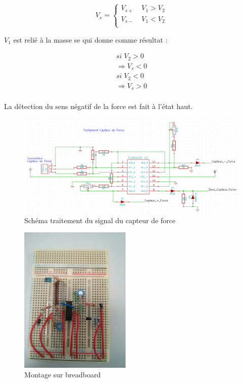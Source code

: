 \documentclass[11pt]{article}
\begin{document}
\begin{equation}
	V_{s} = 
	\left\{
	  \begin{array}{rcr}
	    V_{s+}& \; V_{1}>V_{2} \\
	    V_{s-}& \; V_{1}<V_{2} \\
	  \end{array}
	\right.
\end{equation}

$V_{1}$ est relié à la masse se qui donne comme résultat :

\begin{equation}
 	\begin{split}
		si \; V_{2} > 0 \\
		\Rightarrow V_{s} < 0 \\			
		si \; V_{2} < 0 \\
		\Rightarrow V_{s} > 0 \\			
	\end{split}
\end{equation}

La détection du sens négatif de la force est fait à l'état haut.

\begin{figure}[!h]
    \centering
    \includegraphics[width=500px]{schema_force.png}
    \caption{Schéma traitement du signal du capteur de force}
\end{figure}

\begin{figure}[!h]
    \centering
    \includegraphics[width=200px]{IMG_20160629_203932.jpg}
    \caption{Montage sur breadboard}
\end{figure}
\FloatBarrier
\end{document}
